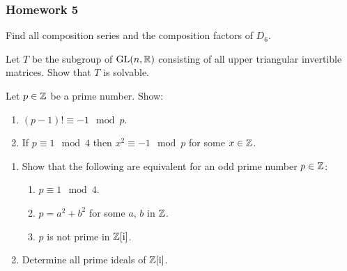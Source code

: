 \subsubsection{Homework 5}
\setcounter{exercise}{0}
\setcounter{equation}{0}

\begin{problem}
  Find all composition series and the composition factors of \(D_6\).
\end{problem}
\begin{solution}
\end{solution}

\begin{problem}
  Let \(T\) be the subgroup of \(\mathrm{GL}(n,\mathbb{R})\) consisting of all upper
  triangular invertible matrices. Show that \(T\) is solvable.
\end{problem}
\begin{solution}
\end{solution}

\begin{problem}
  Let \(p\in\mathbb{Z}\) be a prime number. Show:
  \begin{enumerate}[label=(\alph*)]
  \item \((p-1)!\equiv -1\mod{p}\).
  \item If \(p\equiv 1\mod{4}\) then \(x^2\equiv-1\mod{p}\) for some
    \(x\in\mathbb{Z}\).
  \end{enumerate}
\end{problem}
\begin{solution}
\end{solution}

\begin{problem}
  \hfill
  \begin{enumerate}[label=(\alph*)]
  \item Show that the following are equivalent for an odd prime number
    \(p\in\mathbb{Z}\):
    \begin{enumerate}[label=(\roman*)]
    \item \(p\equiv 1\mod 4\).
    \item \(p=a^2+b^2\) for some \(a\), \(b\) in \(\mathbb{Z}\).
    \item \(p\) is not prime in \(\mathbb{Z}[\mathrm{i}]\).
    \end{enumerate}
  \item Determine all prime ideals of \(\mathbb{Z}[\mathrm{i}]\).
  \end{enumerate}
\end{problem}
\begin{solution}
\end{solution}

